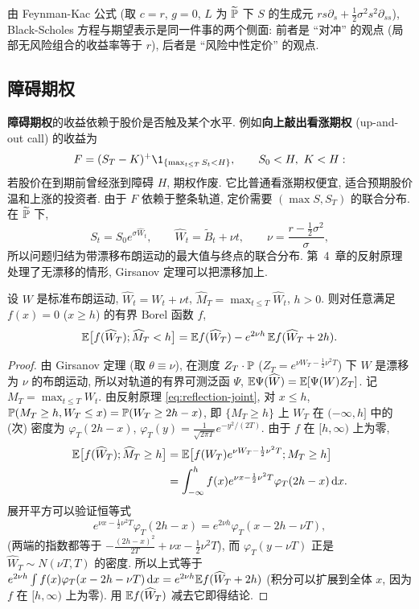 由 Feynman-Kac 公式 (取 $c=r$, $g=0$, $L$ 为 $\widetilde{\P}$ 下 $S$ 的生成元 $rs\partial_s+\frac{1}{2}\sigma^2s^2\partial_{ss}$), Black-Scholes 方程与期望表示是同一件事的两个侧面: 前者是 ``对冲'' 的观点 (局部无风险组合的收益率等于 $r$), 后者是 ``风险中性定价'' 的观点.

\subsection{障碍期权}

\textbf{障碍期权}的收益依赖于股价是否触及某个水平. 例如\textbf{向上敲出看涨期权} (up-and-out call) 的收益为
\[
F=(S_T-K)^+\1_{\{\max_{t\le T}S_t<H\}},\qquad S_0<H,\ K<H:
\]
若股价在到期前曾经涨到障碍 $H$, 期权作废. 它比普通看涨期权便宜, 适合预期股价温和上涨的投资者. 由于 $F$ 依赖于整条轨道, 定价需要 $(\max S,S_T)$ 的联合分布. 在 $\widetilde{\P}$ 下,
\[
S_t=S_0e^{\sigma\widehat{W}_t},\qquad\widehat{W}_t=\widetilde{B}_t+\nu t,\qquad\nu=\frac{r-\frac{1}{2}\sigma^2}{\sigma},
\]
所以问题归结为带漂移布朗运动的最大值与终点的联合分布. 第~4~章的反射原理处理了无漂移的情形, Girsanov 定理可以把漂移加上.

\begin{proposition}[带漂移布朗运动的镜像原理]\label{prop:image}
设 $W$ 是标准布朗运动, $\widehat{W}_t=W_t+\nu t$, $\widehat{M}_T=\max_{t\le T}\widehat{W}_t$, $h>0$. 则对任意满足 $f(x)=0$ ($x\ge h$) 的有界 Borel 函数 $f$,
\[
\E\big[f(\widehat{W}_T);\widehat{M}_T<h\big]=\E f(\widehat{W}_T)-e^{2\nu h}\,\E f(\widehat{W}_T+2h).
\]
\end{proposition}

\begin{proof}
由 Girsanov 定理 (取 $\theta\equiv\nu$), 在测度 $Z_T\cdot\P$ ($Z_T=e^{\nu W_T-\frac{1}{2}\nu^2T}$) 下 $W$ 是漂移为 $\nu$ 的布朗运动, 所以对轨道的有界可测泛函 $\Psi$, $\E\Psi(\widehat{W})=\E[\Psi(W)Z_T]$. 记 $M_T=\max_{t\le T}W_t$. 由反射原理 \eqref{eq:reflection-joint}, 对 $x\le h$, $\P(M_T\ge h,W_T\le x)=\P(W_T\ge2h-x)$, 即 $\{M_T\ge h\}$ 上 $W_T$ 在 $(-\infty,h]$ 中的 (次) 密度为 $\varphi_T(2h-x)$, $\varphi_T(y)=\frac{1}{\sqrt{2\pi T}}e^{-y^2/(2T)}$. 由于 $f$ 在 $[h,\infty)$ 上为零,
\begin{align*}
\E\big[f(\widehat{W}_T);\widehat{M}_T\ge h\big]&=\E\big[f(W_T)e^{\nu W_T-\frac{1}{2}\nu^2T};M_T\ge h\big]\\
&=\int_{-\infty}^hf(x)e^{\nu x-\frac{1}{2}\nu^2T}\varphi_T(2h-x)\dd x.
\end{align*}
展开平方可以验证恒等式
\[
e^{\nu x-\frac{1}{2}\nu^2T}\varphi_T(2h-x)=e^{2\nu h}\varphi_T(x-2h-\nu T),
\]
(两端的指数都等于 $-\frac{(2h-x)^2}{2T}+\nu x-\frac{1}{2}\nu^2T$), 而 $\varphi_T(y-\nu T)$ 正是 $\widehat{W}_T\sim N(\nu T,T)$ 的密度. 所以上式等于 $e^{2\nu h}\int f(x)\varphi_T(x-2h-\nu T)\dd x=e^{2\nu h}\E f(\widehat{W}_T+2h)$ (积分可以扩展到全体 $x$, 因为 $f$ 在 $[h,\infty)$ 上为零). 用 $\E f(\widehat{W}_T)$ 减去它即得结论.
\end{proof}

